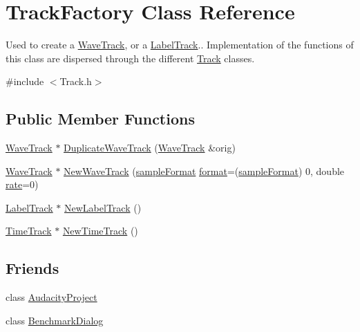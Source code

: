 \hypertarget{class_track_factory}{}\section{Track\+Factory Class Reference}
\label{class_track_factory}


Used to create a \hyperlink{class_wave_track}{Wave\+Track}, or a \hyperlink{class_label_track}{Label\+Track}.. Implementation of the functions of this class are dispersed through the different \hyperlink{class_track}{Track} classes.  




{\ttfamily \#include $<$Track.\+h$>$}

\subsection*{Public Member Functions}
\begin{DoxyCompactItemize}
\item 
\hyperlink{class_wave_track}{Wave\+Track} $\ast$ \hyperlink{class_track_factory_a8ae6b7c1d51a0d1f1de04f848c9989e2}{Duplicate\+Wave\+Track} (\hyperlink{class_wave_track}{Wave\+Track} \&orig)
\item 
\hyperlink{class_wave_track}{Wave\+Track} $\ast$ \hyperlink{class_track_factory_ab1cb74f7da7619abac80e7aa5ebaa5f2}{New\+Wave\+Track} (\hyperlink{include_2audacity_2_types_8h_a9938d2e2f6adef23e745cd80ef379792}{sample\+Format} \hyperlink{_export_p_c_m_8cpp_a317afff57d87a89158c2b038d37b2b08}{format}=(\hyperlink{include_2audacity_2_types_8h_a9938d2e2f6adef23e745cd80ef379792}{sample\+Format}) 0, double \hyperlink{seqread_8c_ad89d3fac2deab7a9cf6cfc8d15341b85}{rate}=0)
\item 
\hyperlink{class_label_track}{Label\+Track} $\ast$ \hyperlink{class_track_factory_ad263a1879b5ab441a739945a57704f2b}{New\+Label\+Track} ()
\item 
\hyperlink{class_time_track}{Time\+Track} $\ast$ \hyperlink{class_track_factory_ad5e4155e17aab29afed19db473ddb4fa}{New\+Time\+Track} ()
\end{DoxyCompactItemize}
\subsection*{Friends}
\begin{DoxyCompactItemize}
\item 
class \hyperlink{class_track_factory_a4c5c7635a59c124e571761313f848a00}{Audacity\+Project}
\item 
class \hyperlink{class_track_factory_ad14f349c97896b1506b357222f99ff4c}{Benchmark\+Dialog}
\end{DoxyCompactItemize}


